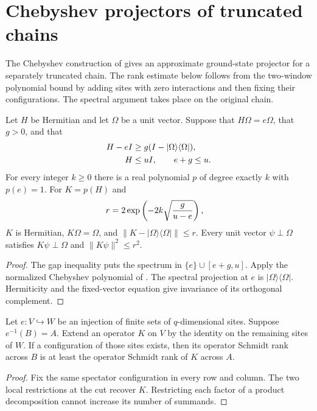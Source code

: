 \section{Chebyshev projectors of truncated chains}

The Chebyshev construction of \cite[Section~4]{Arad2013AreaLaw}
gives an approximate ground-state projector for a separately truncated
chain. The rank estimate below follows from the two-window polynomial
bound by adding sites with zero interactions and then fixing their
configurations. The spectral argument takes place on the original chain.

\begin{lemma}
    \label{lem:aklv_chebyshev_ground_filter}
    \leanok
    Let $H$ be Hermitian and let $\Omega$ be a unit vector.
    Suppose that $H\Omega=e\Omega$, that $g>0$, and that
    \begin{align}
        H-eI & \ge g(I-|\Omega\rangle\langle\Omega|),\notag \\
        H    & \le uI,\qquad e+g\le u.\notag
    \end{align}
    For every integer $k\ge0$ there is a real polynomial $p$ of degree
    exactly $k$ with $p(e)=1$. For $K=p(H)$ and
    \begin{align}
        r & =2\exp\left(-2k\sqrt{\frac{g}{u-e}}\right),\notag
    \end{align}
    $K$ is Hermitian, $K\Omega=\Omega$, and
    $\|K-|\Omega\rangle\langle\Omega|\|\le r$.
    Every unit vector $\psi\perp\Omega$ satisfies
    $K\psi\perp\Omega$ and $\|K\psi\|^2\le r^2$.
\end{lemma}
\begin{proof}\leanok
    The gap inequality puts the spectrum in $\{e\}\cup[e+g,u]$.
    Apply the normalized Chebyshev polynomial of
    \cite[Lemma~4.1]{Arad2013AreaLaw}. The spectral projection at $e$
    is $|\Omega\rangle\langle\Omega|$. Hermiticity and the fixed-vector
    equation give invariance of its orthogonal complement.
\end{proof}

\begin{lemma}
    \label{lem:aklv_spectator_cut_rank}
    \leanok
    Let $e:V\hookrightarrow W$ be an injection of finite sets of
    $q$-dimensional sites. Suppose $e^{-1}(B)=A$.
    Extend an operator $K$ on $V$ by the identity on the remaining sites
    of $W$. If a configuration of those sites exists, then its operator
    Schmidt rank across $B$ is at least the operator Schmidt rank of
    $K$ across $A$.
\end{lemma}
\begin{proof}\leanok
    Fix the same spectator configuration in every row and column.
    The two local restrictions at the cut recover $K$.
    Restricting each factor of a product decomposition cannot increase
    its number of summands.
\end{proof}

